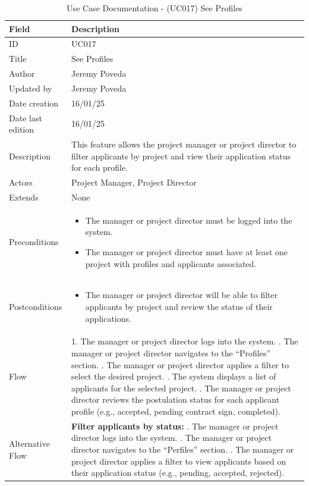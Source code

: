 \documentclass{scrreprt}
\begin{document}
\begin{table}[H]
	\centering
	\begin{tabular}{|p{3cm}|p{10cm}|}
		\hline
		\textbf{Field} & \textbf{Description} \\ \hline
		ID & UC017 \\ \hline
		Title & See Profiles \\ \hline
		Author & Jeremy Poveda \\ \hline
		Updated by & Jeremy Poveda\\ \hline
		Date creation & 16/01/25 \\ \hline
		Date last edition & 16/01/25 \\ \hline
		Description & 
		This feature allows the project manager or project director to filter applicants by project and view their application status for each profile. \\ \hline
		Actors & Project Manager, Project Director \\ \hline
		Extends & None \\ \hline
		Preconditions & 
		\begin{itemize}
			\item The manager or project director must be logged into the system.
			\item The manager or project director must have at least one project with profiles and applicants associated.
		\end{itemize} \\ \hline
		Postconditions & 
		\begin{itemize}
			\item The manager or project director will be able to filter applicants by project and review the status of their applications.
		\end{itemize} \\ \hline
		Flow & 
		1. The manager or project director logs into the system. \newline
		2. The manager or project director navigates to the “Profiles” section. \newline
		3. The manager or project director applies a filter to select the desired project. \newline
		4. The system displays a list of applicants for the selected project. \newline
		5. The manager or project director reviews the postulation status for each applicant profile (e.g., accepted, pending contract sign, completed). \\ \hline
		Alternative Flow & 
		\textbf{Filter applicants by status:} \newline
		1. The manager or project director logs into the system. \newline
		2. The manager or project director navigates to the “Perfiles” section. \newline
		3. The manager or project director applies a filter to view applicants based on their application status (e.g., pending, accepted, rejected). \\ \hline
	\end{tabular}
	\caption{Use Case Documentation - (UC017) See Profiles }
	\label{table:UC017}
\end{table}
\end{document}
